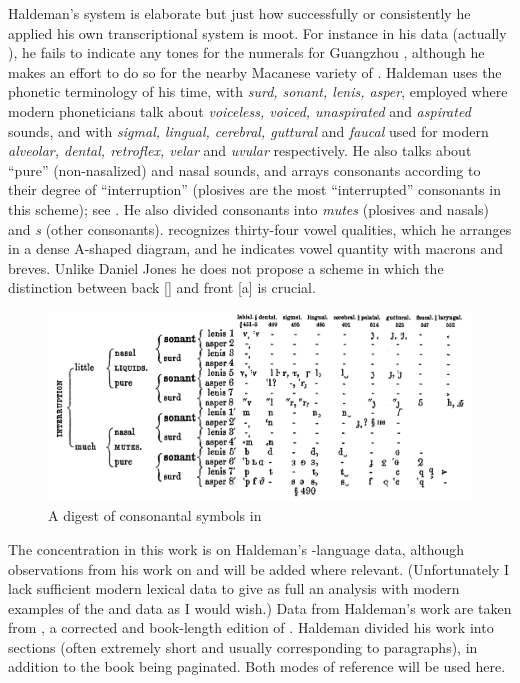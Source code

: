 \documentclass[output=paper]{LSP/langsci}
\begin{document}
Haldeman's system is elaborate but just how successfully or consistently he applied his own transcriptional system is moot. For instance in his  data (actually ), he fails to indicate any tones for the numerals for Guangzhou , although he makes an effort to do so for  the nearby Macanese variety of .  Haldeman uses the phonetic terminology of his time, with \textit{surd, sonant, lenis, asper}, employed where modern phoneticians talk about \textit{voiceless, voiced, unaspirated} and \textit{aspirated} sounds, and with \textit{sigmal, lingual, cerebral, guttural} and \textit{faucal} used for modern \textit{alveolar, dental, retroflex, velar} and \textit{uvular} respectively. He also talks about ``pure'' (non-nasalized) and  nasal  sounds, and arrays consonants according to their degree of ``interruption'' (plosives are the most ``interrupted'' consonants in this scheme); see . He also divided consonants into \textit{mutes} (plosives and nasals) and \textit{s} (other consonants).  \citet[83, 369]{Haldeman1860} recognizes thirty-four vowel qualities, which he arranges in a dense A-shaped diagram, and he indicates vowel quantity with macrons and breves. Unlike Daniel Jones \citeyearpar{Jones1909} he does not propose a scheme in which the distinction between back [] and front [a] is crucial.  

\begin{figure} 
\caption{A digest of consonantal symbols in \citealt[121: \S576]{Haldeman1860}} \label{haldemandigest}

\includegraphics[width=\textwidth]{figures/Grant-consonants2.png}
\end{figure}

The concentration in this work is on Haldeman's -language data, although observations from his work on  and  will be added where relevant. (Unfortunately I lack sufficient modern lexical data to give as full an analysis with modern examples of the  and  data as I would wish.)   Data from Haldeman's work are taken from \citet{Haldeman1860}, a corrected and book-length edition of \citet{Haldeman1859}.  Haldeman divided his work into sections (often extremely short and usually corresponding to paragraphs), in addition to the book being paginated.  Both modes of reference will be used here.  
\end{document}
